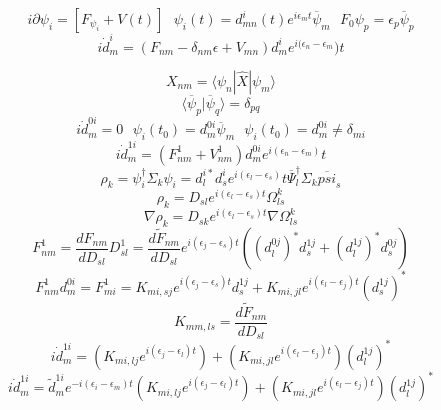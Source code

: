 \documentclass[12pt]{article}
\begin{document}
\begin{equation}
i\partial \psi_{i} = [ F_{\psi_i}+V(t)]
\text{\ \ \ \ \ \ }
\psi_{i}(t) = d^{i}_{mn}(t) e^{{i\epsilon_{m}t}}\overline{\psi}_{m}
\text{\ \ \ \ \ \ }
F_{0} \psi_{p} = \epsilon_{p}\overline{\psi}_{p}
\end{equation}
\begin{equation}
i\dot{d}^{i}_{m} = ( F_{nm} - \delta_{nm}\epsilon +V_{mn})d_{m}^{i}e^{i(\epsilon_{n}-\epsilon_{m}})t  
\end{equation}

\begin{equation}
X_{nm} = \langle \psi_{n} | \hat{X} | \psi_{m} \rangle 
\end{equation}
\begin{equation}
\langle \overline{\psi}_{p} | \overline{\psi}_{q} \rangle = \delta_{pq}
\end{equation}
\begin{equation}
i\dot{d}_{m}^{0i} = 0 
\text{\ \ \ \ \ \ }
\psi_{i}(t_{0}) = d^{0i}_{m}\overline{\psi}_{m}
\text{\ \ \ \ \ \ }
\psi_{i}(t_{0}) = d^{0i}_{m} \neq \delta_{mi}
\end{equation}
\begin{equation}
i\dot{d}_{m}^{1i} = ( F_{nm}^{1} + V_{nm}^{1}) d_{m}^{0i} e^{i(\epsilon_{n}-\epsilon_{m})}t
\end{equation}
\begin{equation}
\rho_{k} = \psi^{\dagger}_{i}\Sigma_{k}\psi_{i} = 
d^{i*}_{l}d_{s}^{i}e^{i(\epsilon_{l}-\epsilon_{s})}t \overline{\Psi}_{l}^{\dagger}\Sigma_{k}\overline{psi}_{s}
\end{equation}
\begin{equation}
\rho_{k} = D_{sl}e^{i(\epsilon_{l}-\epsilon_{s})t}\Omega^{k}_{ls} 
\end{equation}
\begin{equation}
\nabla \rho_{k} = D_{sk} e^{i(\epsilon_{l}-\epsilon_{s})t} \nabla \Omega_{ls}^{k}
\end{equation}
\begin{equation}
F_{nm}^{1} = \frac{d F_{nm}}{d D_{sl} } D^{1}_{sl}
= \frac{d \tilde{F}_{nm}}{d D_{sl} } e^{i(\epsilon_{j}-\epsilon_{s})t}((d_{l}^{0j})^{*} d_{s}^{1j} + (d_{l}^{1j})^{*} d_{s}^{0j} ) 
\end{equation}
\begin{equation}
F_{nm}^{1} d_{m}^{0i} = F_{mi}^{1} =
 K_{mi,sj} e^{i(\epsilon_{j}-\epsilon_{s})t}d_{s}^{1j} +
 K_{mi,jl} e^{i(\epsilon_{l}-\epsilon_{j})t}(d_{s}^{1j})^{*}
\end{equation}
\begin{equation} 
K_{mm, ls} = \frac{d \tilde{F}_{nm}}{d D_{sl}}
\end{equation}
\begin{equation}
i\dot{d}^{1i}_{m} = 
( K_{mi,lj} e^{i(\epsilon_{j} -\epsilon_{l})t}) +
( K_{mi,jl} e^{i(\epsilon_{l} -\epsilon_{j})t})(d_{l}^{1j})^{*}
\end{equation}
\begin{equation}
i\dot{d}^{1i}_{m} = \tilde{d}^{1i}_{m}e^{-i(\epsilon_{i}-\epsilon_{m})t}
( K_{mi,lj} e^{i(\epsilon_{j} -\epsilon_{l})t}) +
( K_{mi,jl} e^{i(\epsilon_{l} -\epsilon_{j})t})(d_{l}^{1j})^{*}
\end{equation}
\end{document}
